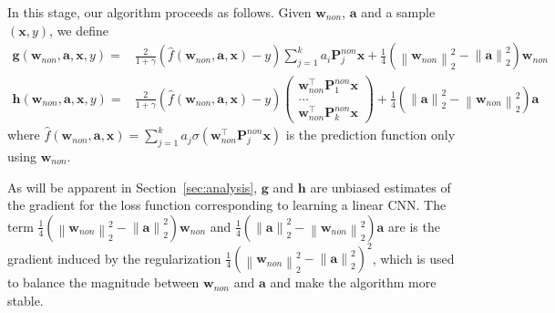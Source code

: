 \documentclass[11pt]{article}
\newcommand{\mat}[1]{\mathbf{#1}}
\newcommand{\vect}[1]{\mathbf{#1}}
\newcommand{\norm}[1]{\left\|#1\right\|}
\newcommand{\relu}[1]{\sigma\left(#1\right)}
\newcommand{\simon}[1]{\textcolor{blue}{[Simon: #1]}}
\begin{document}
In this stage, our algorithm proceeds as follows.
Given $\vect{w}_{non}$, $\vect{a}$ and a sample $\left(\vect{x},y\right)$, we define \begin{align}
\vect{g}\left(\vect{w}_{non},\vect{a},\vect{x},y\right) = &\frac{2}{1+\gamma}\left(
	\hat{f}(\vect{w}_{non},\vect{a},\vect{x}) - y
	\right) \sum_{j=1}^{k}a_i\mat{P}_j^{non} \vect{x}+\frac{1}{4}\left(\norm{\vect{w}_{non}}_2^2-\norm{\vect{a}}_2^2\right)\vect{w}_{non} \label{eqn:w_non_update}\\
\vect{h}\left(\vect{w}_{non},\vect{a},\vect{x},y\right) =  &\frac{2}{1+\gamma}\left(
	\hat{f}(\vect{w}_{non},\vect{a},\vect{x}) - y\right) \begin{pmatrix}
		\vect{w}_{non}^\top\mat{P}_1^{non} \vect{x}\\
		\ldots\\
		\vect{w}_{non}^\top\mat{P}_k^{non} \vect{x}
	\end{pmatrix}+ \frac{1}{4}\left(\norm{\vect{a}}_2^2-\norm{\vect{w}_{non}}_2^2\right)\vect{a} \label{eqn:a_update}
\end{align}
where $\hat{f}\left(\vect{w}_{non},\vect{a},\vect{x}\right) = \sum_{j=1}^{k}a_j\relu{\vect{w}_{non}^\top \mat{P}_j^{non}\vect{x}}$ is the prediction function only using $\vect{w}_{non}$.

As will be apparent in Section~\ref{sec:analysis}, $\vect{g}$ and $\vect{h}$ are unbiased estimates of the gradient for the loss function corresponding to learning a linear CNN.
The term $\frac{1}{4}\left(\norm{\vect{w}_{non}}_2^2-\norm{\vect{a}}_2^2\right)\vect{w}_{non}$  and $\frac{1}{4}\left(\norm{\vect{a}}_2^2-\norm{\vect{w}_{non}}_2^2\right)\vect{a}$ are is the gradient induced by the regularization  $\frac{1}{4}\left(\norm{\vect{w}_{non}}_2^2-\norm{\vect{a}}_2^2\right)^2$, which is used to balance the magnitude between $\vect{w}_{non}$ and $\vect{a}$ and make the algorithm more stable.  
\end{document}
